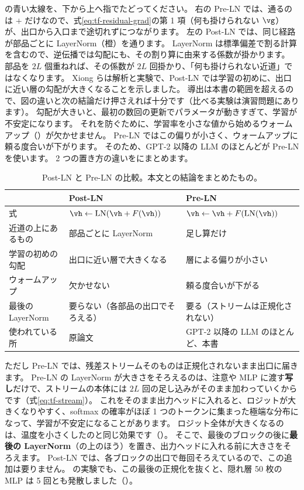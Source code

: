 の青い太線を、下から上へ指でたどってください。
右の Pre-LN では、通るのは $+$ だけなので、式\eqref{eq:tf-residual-grad}の第 1 項（何も掛けられない $\vg$）が、出口から入口まで途切れずにつながります。
左の Post-LN では、同じ経路が部品ごとに LayerNorm（橙）を通ります。
LayerNorm は標準偏差で割る計算を含むので、逆伝播では勾配にも、その割り算に由来する係数が掛かります。
部品を $2L$ 個重ねれば、その係数が $2L$ 回掛かり、「何も掛けられない近道」ではなくなります。
Xiong らは解析と実験で、Post-LN では学習の初めに、出口に近い層の勾配が大きくなることを示しました\cite{xiong2020layer}。
導出は本書の範囲を超えるので、図の違いと次の結論だけ押さえれば十分です（比べる実験は演習問題にあります）。
勾配が大きいと、最初の数回の更新でパラメータが動きすぎて、学習が不安定になります。
それを防ぐために、学習率を小さな値から始めるウォームアップ（）が欠かせません。
Pre-LN ではこの偏りが小さく、ウォームアップに頼る度合いが下がります。
そのため、GPT-2 以降の LLM のほとんどが Pre-LN を使います。
2 つの置き方の違いをにまとめます。

\begin{table}[tbp]
\centering
\caption{Post-LN と Pre-LN の比較。本文と\cite{xiong2020layer}の結論をまとめたもの。}
\label{tab:tf-ln-compare}
\small
\begin{tabular}{p{30mm}p{42mm}p{42mm}}
\toprule
 & Post-LN & Pre-LN \\
\midrule
式 & $\vh\leftarrow\mathrm{LN}(\vh+F(\vh))$ & $\vh\leftarrow\vh+F(\mathrm{LN}(\vh))$ \\
近道の上にあるもの & 部品ごとに LayerNorm & 足し算だけ \\
学習の初めの勾配 & 出口に近い層で大きくなる & 層による偏りが小さい \\
ウォームアップ & 欠かせない & 頼る度合いが下がる \\
最後の LayerNorm & 要らない（各部品の出口でそろえる） & 要る（ストリームは正規化されない） \\
使われている所 & 原論文 & GPT-2 以降の LLM のほとんど、本書 \\
\bottomrule
\end{tabular}
\end{table}

ただし Pre-LN では、残差ストリームそのものは正規化されないまま出口に届きます。
Pre-LN の LayerNorm が大きさをそろえるのは、注意や MLP に渡す\textbf{写し}だけで、ストリームの本体には $2L$ 回の足し込みがそのまま加わっていくからです（式\eqref{eq:tf-stream}）。
これをそのまま出力ヘッドに入れると、ロジットが大きくなりやすく、softmax の確率がほぼ 1 つのトークンに集まった極端な分布になって、学習が不安定になることがあります。
ロジット全体が大きくなるのは、温度を小さくしたのと同じ効果です（）。
そこで、最後のブロックの後に\textbf{最後の LayerNorm}（の上のほう）を置き、出力ヘッドに入れる前に大きさをそろえます。
Post-LN では、各ブロックの出口で毎回そろえているので、この追加は要りません。
の実験でも、この最後の正規化を抜くと、隠れ層 50 枚の MLP は 5 回とも発散しました（）。

